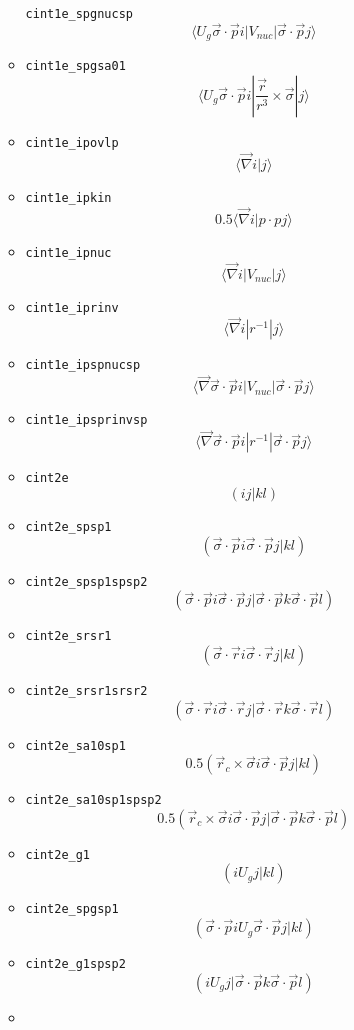 \documentclass{article}
\begin{document}
\begin{itemize}
\begin{itemize}
    \verb!cint1e_spgnucsp!
    \[\langle U_g \vec{\sigma}\cdot\vec{p} i| V_{nuc} | \vec{\sigma}\cdot\vec{p}j\rangle \]
  \item
    \verb!cint1e_spgsa01!
    \[\langle U_g \vec{\sigma}\cdot\vec{p} i| \frac{\vec{r}}{r^3} \times\vec{\sigma} |j\rangle \]
  \item
    \verb!cint1e_ipovlp! \[\langle \vec{\nabla} i|j\rangle \]
  \item
    \verb!cint1e_ipkin!
    \[0.5\langle \vec{\nabla} i| p \cdot pj\rangle \]
  \item
    \verb!cint1e_ipnuc! \[\langle \vec{\nabla} i| V_{nuc}|j\rangle \]
  \item
    \verb!cint1e_iprinv! \[\langle \vec{\nabla} i| r^{-1}|j\rangle \]
  \item
    \verb!cint1e_ipspnucsp!
    \[\langle \vec{\nabla} \vec{\sigma}\cdot\vec{p} i| V_{nuc}| \vec{\sigma}\cdot\vec{p}j\rangle \]
  \item
    \verb!cint1e_ipsprinvsp!
    \[\langle \vec{\nabla} \vec{\sigma}\cdot\vec{p} i| r^{-1}| \vec{\sigma}\cdot\vec{p}j\rangle \]
  \item
    \verb!cint2e! \[(ij|kl)\]
  \item
    \verb!cint2e_spsp1!
    \[(\vec{\sigma}\cdot\vec{p} i \vec{\sigma}\cdot\vec{p} j| k l)\]
  \item
    \verb!cint2e_spsp1spsp2!
    \[(\vec{\sigma}\cdot\vec{p} i \vec{\sigma}\cdot\vec{p} j| \vec{\sigma}\cdot\vec{p} k \vec{\sigma}\cdot\vec{p} l)\]
  \item
    \verb!cint2e_srsr1!
    \[(\vec{\sigma}\cdot\vec{r} i \vec{\sigma}\cdot\vec{r} j| kl)\]
  \item
    \verb!cint2e_srsr1srsr2!
    \[(\vec{\sigma}\cdot\vec{r} i \vec{\sigma}\cdot\vec{r} j| \vec{\sigma}\cdot\vec{r} k \vec{\sigma}\cdot\vec{r}l)\]
  \item
    \verb!cint2e_sa10sp1!
    \[0.5 (\vec{r}_c \times\vec{\sigma} i \vec{\sigma}\cdot\vec{p} j| kl)\]
  \item
    \verb!cint2e_sa10sp1spsp2!
    \[0.5 (\vec{r}_c \times\vec{\sigma} i \vec{\sigma}\cdot\vec{p} j| \vec{\sigma}\cdot\vec{p} k \vec{\sigma}\cdot\vec{p} l)\]
  \item
    \verb!cint2e_g1! \[(i U_g j| kl)\]
  \item
    \verb!cint2e_spgsp1!
    \[(\vec{\sigma}\cdot\vec{p} i U_g \vec{\sigma}\cdot\vec{p} j| kl)\]
  \item
    \verb!cint2e_g1spsp2!
    \[(i U_g j| \vec{\sigma}\cdot\vec{p} k \vec{\sigma}\cdot\vec{p}l)\]
  \item

\end{itemize}
\end{itemize}
\end{document}
